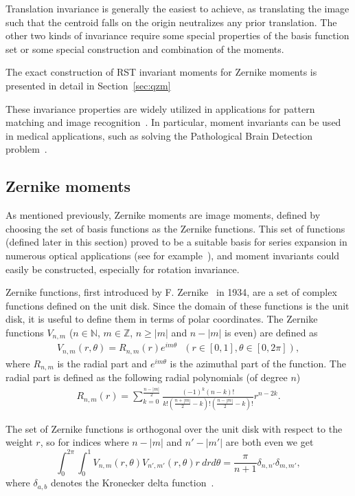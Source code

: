 Translation invariance is generally the easiest to achieve, as translating the image such that the centroid falls on the origin neutralizes any prior translation. The other two kinds of invariance require some special properties of the basis function set or some special construction and combination of the moments.


The exact construction of RST invariant moments for Zernike moments is presented in detail in Section~\ref{sec:qzm}


These invariance properties are widely utilized in applications for pattern matching and image recognition~\cite{app1, app2, app3}. In particular, moment invariants can be used in medical applications, such as solving the Pathological Brain Detection problem~\cite{med_app_1}.


\subsection{Zernike moments}
As mentioned previously, Zernike moments are image moments, defined by choosing the set of basis functions as the Zernike functions. This set of functions (defined later in this section) proved to be a suitable basis for series expansion in numerous optical applications (see for example~\cite{wavefront,optical_human_eye,opt_surf}), and moment invariants could easily be constructed, especially for rotation invariance.


Zernike functions, first introduced by F. Zernike~\cite{zernike} in 1934, are a set of complex functions defined on the unit disk. Since the domain of these functions is the unit disk, it is useful to define them in terms of polar coordinates. The Zernike functions $V_{n,m}$ ($n \in \mathds{N}$, $m \in \mathds{Z}$, $n \geq |m|$ and $n - |m|$ is even) are defined as
\begin{gather*}
  V_{n,m}(r,\theta) = R_{n,m}(r) e^{i m\theta} \ \ \ (r\in[0,1], \theta\in[0,2\pi]),
\end{gather*}
where $R_{n,m}$ is the radial part and $e^{i m\theta}$ is the azimuthal part of the function. The radial part is defined as the following radial polynomials (of degree $n$)
\begin{gather}
    R_{n,m}(r) = \sum_{k=0}^{\frac{n - |m|}{2}}\frac{(-1)^k (n - k)!}{k!\left(\frac{n + |m|}{2} - k\right)!\left(\frac{n - |m|}{2} - k\right)!}r^{n-2k} \label{eq:radial_poly}.
\end{gather} 


The set of Zernike functions is orthogonal over the unit disk with respect to the weight $r$, so for indices where $n - |m|$ and $n' - |m'|$ are both even we get
\begin{equation}
	\int_0^{2\pi}\int_0^1 V_{n,m}(r,\theta)V_{n',m'}(r,\theta)r\ dr d\theta  = \frac{\pi}{n + 1}\delta_{n,n'}\delta_{m,m'},
\end{equation}
where $\delta_{a,b}$ denotes the Kronecker delta function~\cite{zernike_moments}.

